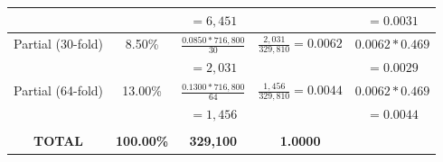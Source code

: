 \documentclass[submission,copyright,creativecommons]{eptcs}
\begin{document}
\begin{table}[htp]
\begin{center}
\begin{tabular}{c|c|c|c|c}
            &               & $= 6,451$                                            &                                                         & $=0.0031$ \\
 \hline
  Partial (30-fold)   & 8.50\% & $\frac{0.0850*716,800}{30}$ & $\frac{2,031}{329,810} = 0.0062$ & $0.0062 * 0.469$ \\
            &               & $= 2,031$                                            &                                                         & $=0.0029$ \\
  \hline
  Partial (64-fold)   & 13.00\% & $\frac{0.1300*716,800}{64}$ & $\frac{1,456}{329,810} = 0.0044$ & $0.0062 * 0.469$ \\
            &               & $= 1,456$                                            &                                                         & $=0.0044$ \\
  \hline
   &  &   &   &  \\
 \textbf{TOTAL}   & \textbf{100.00\%} & \textbf{329,100} & \textbf{1.0000} &  \\
  \hline

\end{tabular}
\end{center}
\end{table}
\end{document}
